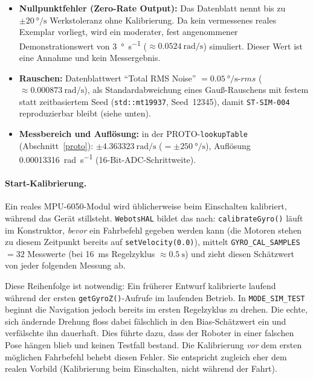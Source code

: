 \documentclass[
  a4paper,
  12pt,
  DIV=12,        %
  parskip=half,  %
  headings=small %
]{scrartcl}
\theoremstyle{definition}
\providecommand{\tightlist}{%
  \setlength{\itemsep}{0pt}\setlength{\parskip}{0pt}}
\theoremstyle{definition}
\begin{document}
\begin{itemize}
\tightlist
\item
  \textbf{Nullpunktfehler (Zero-Rate Output):} Das Datenblatt nennt bis zu
  $\pm\SI{20}{\degree\per\second}$ Werkstoleranz ohne Kalibrierung. Da kein
  vermessenes reales Exemplar vorliegt, wird ein moderater, fest
  angenommener Demonstrationswert von \SI{3}{\degree\per\second}
  ($\approx\SI{0.0524}{\radian\per\second}$) simuliert. Dieser Wert ist
  eine Annahme und kein Messergebnis.
\item
  \textbf{Rauschen:} Datenblattwert \enquote{Total RMS Noise}
  $= \SI{0.05}{\degree\per\second\text{-}rms}$
  ($\approx\SI{0.000873}{\radian\per\second}$), als Standardabweichung
  eines Gauß-Rauschens mit festem statt zeitbasiertem Seed
  (\texttt{std::mt19937}, Seed~12345), damit
  \texttt{ST-SIM-004} reproduzierbar bleibt (siehe unten).
\item
  \textbf{Messbereich und Auflösung:} in der PROTO-\texttt{lookupTable}
  (Abschnitt~\ref{proto}): $\pm\SI{4.363323}{\radian\per\second}$
  ($=\pm\SI{250}{\degree\per\second}$), Auflösung
  \SI{0.00013316}{\radian\per\second} (16-Bit-ADC-Schrittweite).
\end{itemize}

\paragraph{Start-Kalibrierung.} Ein reales MPU-6050-Modul wird üblicherweise
beim Einschalten kalibriert, während das Gerät stillsteht. \texttt{WebotsHAL}
bildet das nach:
\texttt{calibrateGyro()} läuft im Konstruktor, \emph{bevor} ein
Fahrbefehl gegeben werden kann (die Motoren stehen zu diesem Zeitpunkt
bereits auf \texttt{setVelocity(0.0)}), mittelt \texttt{GYRO\_CAL\_SAMPLES}
$= 32$ Messwerte (bei \SI{16}{\milli\second} Regelzyklus $\approx
\SI{0.5}{\second}$) und zieht diesen Schätzwert von jeder folgenden
Messung ab.

Diese Reihenfolge ist notwendig: Ein früherer
Entwurf kalibrierte laufend während der ersten
\texttt{getGyroZ()}-Aufrufe im laufenden Betrieb. In
\texttt{MODE\_SIM\_TEST} beginnt die Navigation jedoch bereits im ersten
Regelzyklus zu drehen. Die echte, sich ändernde Drehung floss dabei
fälschlich in den Bias-Schätzwert ein und verfälschte ihn dauerhaft.
Dies führte dazu, dass der Roboter in einer falschen Pose hängen blieb
und keinen Testfall bestand. Die Kalibrierung \emph{vor} dem ersten
möglichen Fahrbefehl behebt diesen Fehler. Sie entspricht zugleich eher dem
realen Vorbild (Kalibrierung beim Einschalten, nicht während der Fahrt).
\end{document}
